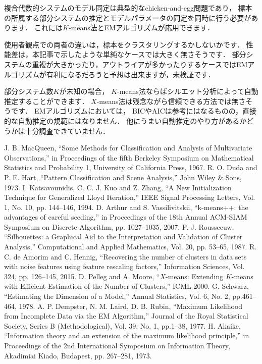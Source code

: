 ﻿\documentclass{jsarticle}
\begin{document}
複合代数的システムのモデル同定は典型的なchicken-and-egg問題であり，
標本の所属する部分システムの推定とモデルパラメータの同定を同時に行う必要があります．
これには$K$-means法とEMアルゴリズムが応用できます．

使用者観点での両者の違いは，標本をクラスタリングするかしないかです．
性能差は，本記事で示したような単純なケースでは大きく無さそうです．
部分システムの重複が大きかったり，アウトライアが多かったりするケースではEMアルゴリズムが有利になるだろうと予想は出来ますが，未検証です．

部分システム数$K$が未知の場合，
$K$-means法ならばシルエット分析によって自動推定することができます．
$X$-means法は残念ながら信頼できる方法では無さそうです．
EMアルゴリズムにおいては，
BICやAICは参考にはなるものの，直接的な自動推定の規範にはなりません．
他にうまい自動推定のやり方があるかどうかは十分調査できていません．





\begin{thebibliography}{99}
J. B. MacQueen,
``Some Methods for Classification and Analysis of Multivariate Observations,''
in Proceedings of the fifth Berkeley Symposium on Mathematical Statistics and Probability 1, University of California Press, 1967.
R. O. Duda and P. E. Hart,
``Pattern Classification and Scene Analysis,'' John Wiley {\&} Sons, 1973.
I. Katsavounidis, C. C. J. Kuo and Z. Zhang,
``A New Initialization Technique for Generalized Lloyd Iteration,''
IEEE Signal Processing Letters, Vol. 1, No. 10, pp. 144--146, 1994.
D. Arthur and S. Vassilivitskii,
``k-means++: the advantages of careful seeding,''
in Proceedings of the 18th Annual ACM-SIAM Symposium on Discrete Algorithm, pp. 1027--1035, 2007.
P. J. Rousseeuw,
``Silhouettes: a Graphical Aid to the Interpretation and Validation of Cluster Analysis,''
Computational and Applied Mathematics, Vol. 20, pp. 53--65, 1987.
R. C. de Amorim and C. Hennig,
``Recovering the number of clusters in data sets with noise features using feature rescaling factors,''
Information Sciences, Vol. 324, pp. 126--145, 2015.
D. Pelleg and A. Moore,
``$X$-means: Extending $K$-means with Efficient Estimation of the Number of Clusters,''
ICML-2000.
G. Schwarz,
``Estimating the Dimension of a Model,''
Annual Statistics, Vol. 6, No. 2, pp.461--464, 1978.
A. P. Dempster, N. M. Laird, D. B. Rubin,
``Maximum Likelihood from Incomplete Data via the EM Algorithm,''
Journal of the Royal Statistical Society, Series B (Methodological), Vol. 39, No. 1, pp.1--38, 1977.
H. Akaike,
``Information theory and an extension of the maximum likelihood principle,''
in Proceedings of the 2nd International Symposium on Information Theory, Akadimiai Kiado, Budapest, pp. 267--281, 1973.
\end{thebibliography}
\end{document}
